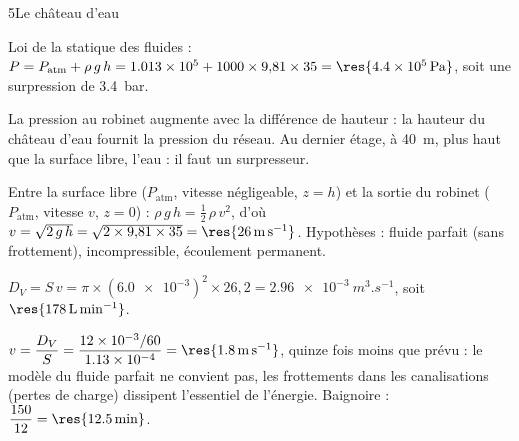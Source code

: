 \begin{corrigeBac}{5}{Le château d'eau}
\begin{questions}
\item Loi de la statique des fluides : $P=P_\mathrm{atm}+\rho\,g\,h=\num{1.013e5}+1000\times9{,}81\times35=\res{\qty{4,4e5}{Pa}}$, soit une
surpression de \qty{3,4}{bar}. \pts{1 pt}
\item La pression au robinet augmente avec la différence de hauteur : la hauteur du château d'eau fournit la pression du
réseau. Au dernier étage, à \qty{40}{m}, plus haut que la surface libre, l'eau  : il faut un surpresseur. 
\item Entre la surface libre ($P_\mathrm{atm}$, vitesse négligeable, $z=h$) et la sortie du robinet ($P_\mathrm{atm}$, vitesse $v$, $z=0$) :
$\rho\,g\,h=\frac12\,\rho\,v^2$, d'où $v=\sqrt{2\,g\,h}=\sqrt{2\times9{,}81\times35}=\res{\qty{26}{m.s^{-1}}}$. Hypothèses : fluide parfait (sans
frottement), incompressible, écoulement permanent. \pts{1 pt}
\item $D_V=S\,v=\pi\times(\num{6.0e-3})^2\times26{,}2=\qty{2,96e-3}{m^3.s^{-1}}$, soit $\res{\qty{178}{L.min^{-1}}}$. 
\item $v=\dfrac{D_V}{S}=\dfrac{\num{12e-3}/60}{\num{1.13e-4}}=\res{\qty{1,8}{m.s^{-1}}}$, quinze fois moins que prévu : le modèle du fluide parfait ne
convient pas, les frottements dans les canalisations (pertes de charge) dissipent l'essentiel de l'énergie. Baignoire :
$\dfrac{150}{12}=\res{\qty{12,5}{min}}$. 
\end{questions}
\end{corrigeBac}
